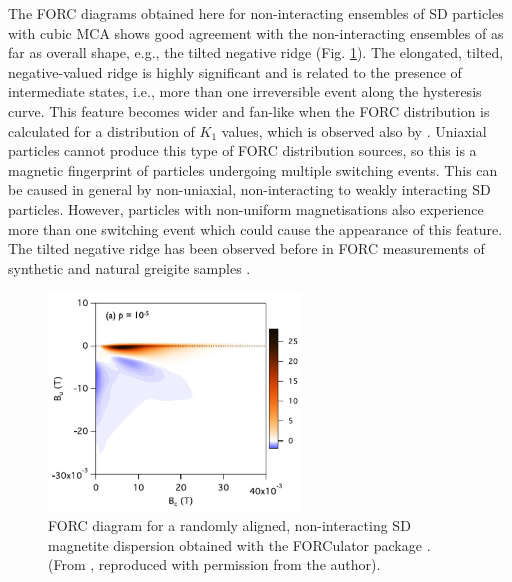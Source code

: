 The FORC diagrams obtained here for non-interacting ensembles of SD particles with cubic MCA shows good agreement with the non-interacting ensembles of \citet{Harrison2014} as far as overall shape, e.g., the tilted negative ridge (Fig. \ref{FIG_E05}). The elongated, tilted, negative-valued ridge is highly significant and is related to the presence of intermediate states, i.e., more than one irreversible event along the hysteresis curve. This feature becomes wider and fan-like when the FORC distribution is calculated for a distribution of $K_1$ values, which is observed also by \citet{Harrison2014}. Uniaxial particles cannot produce this type of FORC distribution sources, so this is a magnetic fingerprint of particles undergoing multiple switching events. This can be caused in general by non-uniaxial, non-interacting to weakly interacting SD particles. However, particles with non-uniform magnetisations also experience more than one switching event which could cause the appearance of this feature. The tilted negative ridge has been observed before in FORC measurements of synthetic and natural greigite samples \citep{Roberts2011}.
\begin{figure}
\centering
\includegraphics[width=0.6\textwidth]{research-2/figs/Harrison2014.pdf}
\caption[FORC diagram of magnetite (FORCulator)]{FORC diagram for a randomly aligned, non-interacting SD magnetite dispersion obtained with the FORCulator package \citep{Harrison2014}. (From \citet{Harrison2014}, reproduced with permission from the author).}
\label{FIG_E05}
\end{figure}\par


